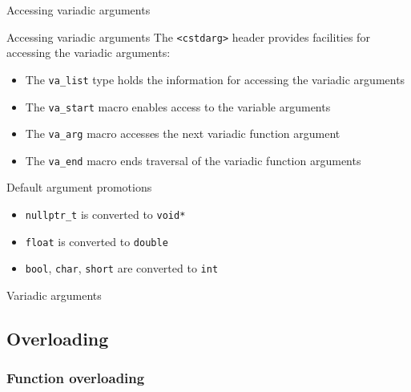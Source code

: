 \begin{frame}{Accessing variadic arguments}{}
  \begin{block}{Accessing variadic arguments}
    The \lstinline!<cstdarg>! header provides facilities for accessing the variadic arguments:
    \begin{itemize}
    \item
      The \lstinline!va_list! type holds the information for accessing the variadic arguments
    \item
      The \lstinline!va_start! macro enables access to the variable arguments
    \item
      The \lstinline!va_arg! macro accesses the next variadic function argument
    \item
      The \lstinline!va_end! macro ends traversal of the variadic function arguments
    \end{itemize}
  \end{block}

  \begin{block}{Default argument promotions}
    \begin{itemize}
    \item
      \lstinline!nullptr_t! is converted to \lstinline!void*!
    \item
      \lstinline!float! is converted to \lstinline!double!
    \item
      \lstinline!bool!, \lstinline!char!, \lstinline!short! are converted to \lstinline!int!
    \end{itemize}
  \end{block}
\end{frame}

\begin{frame}{Variadic arguments}{}
  \begin{example}
  \end{example}
\end{frame}


\subsection{Overloading}

\subsubsection{Function overloading}

